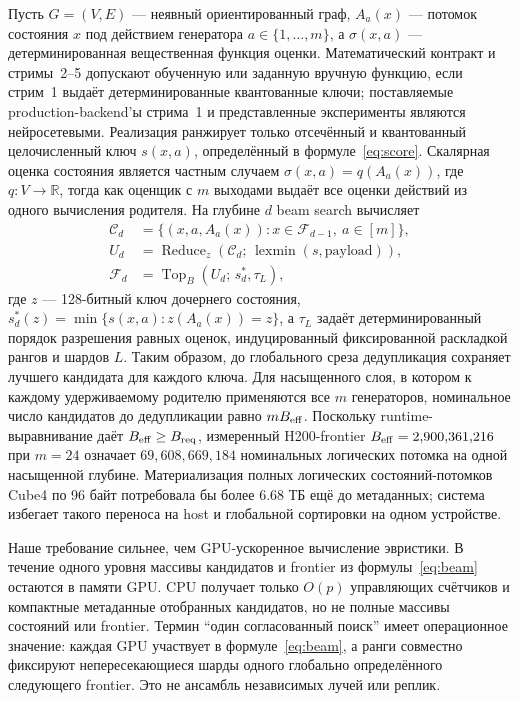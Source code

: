 \documentclass[10pt,twocolumn]{article}
\newcommand{\beam}{B}
\newcommand{\frontier}{\mathcal{F}}
\newcommand{\cand}{\mathcal{C}}
\begin{document}
Пусть $G=(V,E)$ --- неявный ориентированный граф, $A_a(x)$ --- потомок
состояния $x$ под действием генератора $a\in\{1,\ldots,m\}$, а $\sigma(x,a)$
--- детерминированная вещественная функция оценки. Математический контракт и
стримы~2--5 допускают обученную или заданную вручную функцию, если стрим~1
выдаёт детерминированные квантованные ключи; поставляемые production-backend'ы
стрима~1 и представленные эксперименты являются нейросетевыми. Реализация
ранжирует только отсечённый и квантованный целочисленный ключ $s(x,a)$,
определённый в
формуле~\eqref{eq:score}. Скалярная оценка состояния является частным случаем
$\sigma(x,a)=q(A_a(x))$, где $q:V\rightarrow\mathbb{R}$, тогда как оценщик с
$m$ выходами выдаёт все оценки действий из одного вычисления родителя.
На глубине $d$ beam search вычисляет
\begin{align}
  \cand_d &= \{(x,a,A_a(x)):x\in\frontier_{d-1},\ a\in[m]\},\nonumber\\
  U_d &= \operatorname{Reduce}_{z}
  (\cand_d;\,\operatorname{lexmin}(s,\mathrm{payload})),\\
  \frontier_d &= \operatorname{Top}_{\beam}
  \left(U_d;\,s_d^*,\tau_L\right),
  \label{eq:beam}
\end{align}
где $z$ --- 128-битный ключ дочернего состояния,
$s_d^*(z)=\min\{s(x,a):z(A_a(x))=z\}$, а $\tau_L$ задаёт
детерминированный порядок разрешения равных оценок, индуцированный фиксированной раскладкой
рангов и шардов $L$. Таким образом, до глобального среза дедупликация сохраняет
лучшего кандидата для каждого ключа. Для насыщенного слоя, в котором к каждому удерживаемому
родителю применяются все $m$ генераторов, номинальное число кандидатов до
дедупликации равно $m\beam_{\rm eff}$. Поскольку runtime-выравнивание даёт
$\beam_{\rm eff}\geq\beam_{\rm req}$, измеренный H200-frontier
$\beam_{\rm eff}=2{,}900{,}361{,}216$ при $m=24$ означает
$69{,}608{,}669{,}184$ номинальных логических потомка на одной насыщенной
глубине. Материализация полных логических состояний-потомков Cube4 по 96 байт
потребовала бы более $6.68$ ТБ ещё до метаданных; система избегает такого переноса на host
и глобальной сортировки на одном устройстве.

Наше требование сильнее, чем GPU-ускоренное вычисление эвристики. В течение
одного уровня массивы кандидатов и frontier из формулы~\eqref{eq:beam} остаются
в памяти GPU. CPU получает только $O(p)$ управляющих счётчиков и компактные
метаданные отобранных кандидатов, но не полные массивы состояний или frontier.
Термин ``один согласованный поиск'' имеет операционное значение: каждая GPU
участвует в формуле~\eqref{eq:beam}, а ранги совместно фиксируют непересекающиеся
шарды одного глобально определённого следующего frontier. Это не ансамбль
независимых лучей или реплик.
\end{document}
